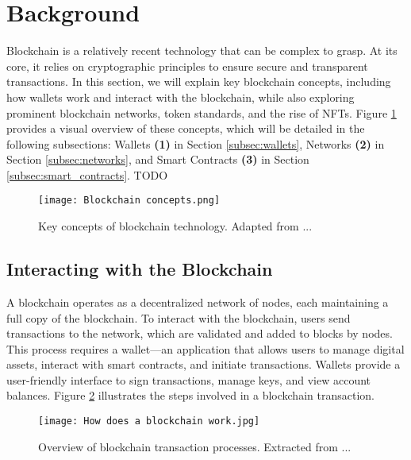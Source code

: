 \section{Background}
\label{sec:background}

Blockchain is a relatively recent technology that can be complex to grasp. At
its core, it relies on cryptographic principles to ensure secure and
transparent transactions. In this section, we will explain key blockchain
concepts, including how wallets work and interact with the blockchain, while
also exploring prominent blockchain networks, token standards, and the rise of
NFTs. Figure \ref{fig:blockchain_concepts} provides a visual overview of these
concepts, which will be detailed in the following subsections: Wallets
\textbf{(1)} in Section \ref{subsec:wallets}, Networks \textbf{(2)} in Section
\ref{subsec:networks}, and Smart Contracts \textbf{(3)} in Section
\ref{subsec:smart_contracts}. TODO

\begin{figure}[H]
    \centering
    \texttt{[image: Blockchain concepts.png]}
    \caption[Blockchain concepts]{Key concepts of blockchain technology. Adapted from ...}
    \label{fig:blockchain_concepts}
\end{figure}

\subsection{Interacting with the Blockchain}
\label{subsec:interacting_with_the_blockchain}

A blockchain operates as a decentralized network of nodes, each maintaining a
full copy of the blockchain. To interact with the blockchain, users send
transactions to the network, which are validated and added to blocks by nodes.
This process requires a wallet—an application that allows users to manage
digital assets, interact with smart contracts, and initiate transactions.
Wallets provide a user-friendly interface to sign transactions, manage keys,
and view account balances. Figure \ref{fig:how_does_a_blockchain_work}
illustrates the steps involved in a blockchain transaction.

\begin{figure}[H]
    \centering
    \texttt{[image: How does a blockchain work.jpg]}
    \caption[Blockchain transaction process]{Overview of blockchain transaction processes. Extracted from ...}
    \label{fig:how_does_a_blockchain_work}
\end{figure}


